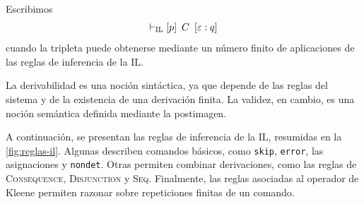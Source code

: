 \documentclass[a4paper,	11pt]{report}
\begin{document}
\begin{definicion}[Derivabilidad en la IL]
\label{def:derivabilidad}
Escribimos
$$\vdash_{\mathrm{IL}} \left\lbrack p \right\rbrack~C~\left\lbrack \varepsilon : q \right\rbrack$$
cuando la tripleta puede obtenerse mediante un número finito de aplicaciones de las reglas de inferencia de la IL.
\end{definicion}

La derivabilidad es una noción sintáctica,
ya que depende de las reglas del sistema y de la existencia de una derivación finita.
La validez, en cambio, es una noción semántica definida mediante la postimagen.

A continuación, se presentan las reglas de inferencia de la IL,
resumidas en la \autoref{fig:reglas-il}.
Algunas describen comandos básicos, como \texttt{skip}, \texttt{error},
las asignaciones y \texttt{nondet}.
Otras permiten combinar derivaciones,
como las reglas de \textsc{Consequence}, \textsc{Disjunction} y \textsc{Seq}.
Finalmente, las reglas asociadas al operador de Kleene permiten razonar sobre repeticiones finitas de un comando.
\end{document}
